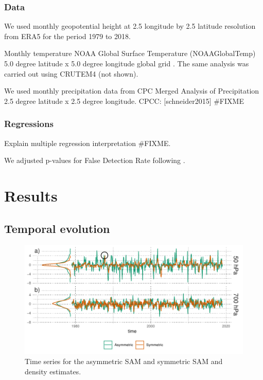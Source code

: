 \documentclass[]{ametsocV5}
\begin{document}
\subsubsection{Data}

We used monthly geopotential height at 2.5 longitude by 2.5 latitude
resolution from ERA5 \citep{hersbach2020} for the period 1979 to 2018.

Monthly temperature NOAA Global Surface Temperature (NOAAGlobalTemp) 5.0
degree latitude x 5.0 degree longitude global grid
\citep{vose2012, smith2008}. The same analysis was carried out using
CRUTEM4 \citep{osborn2014} (not shown).

We used monthly precipitation data from CPC Merged Analysis of
Precipitation \citep{xie1997} 2.5 degree latitude x 2.5 degree
longitude. CPCC: {[}schneider2015{]} \#FIXME

\subsubsection{Regressions}

Explain multiple regression interpretation \#FIXME.

We adjusted p-values for False Detection Rate following
\citet{wilks2016}.

\section{Results}

\subsection{Temporal evolution}

\begin{figure}
\includegraphics{asymsam-timeseries-1} \caption[Time series for the asymmetric SAM and symmetric SAM and density estimates]{Time series for the asymmetric SAM and symmetric SAM and density estimates.}\label{fig:asymsam-timeseries}
\end{figure}
\end{document}
